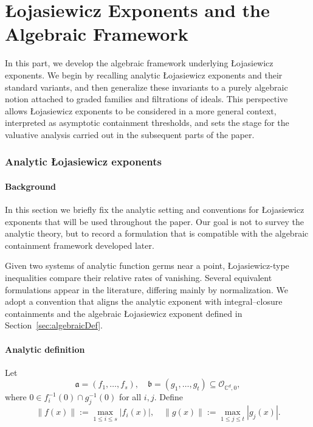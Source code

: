 \documentclass[12pt]{amsart}
\newcommand{\CC}{\mathbb{C}}
\renewcommand{\a}{\mathfrak{a}}
\renewcommand{\b}{\mathfrak{b}}
\newcommand{\cO}{\mathcal{O}}
\theoremstyle{plain}
\theoremstyle{definition}
\numberwithin{equation}{section}
\begin{document}
\part{\L{}ojasiewicz Exponents and the Algebraic Framework} \label{part:algebraicFramework}

In this part, we develop the algebraic framework underlying \L{}ojasiewicz exponents.
We begin by recalling analytic \L{}ojasiewicz exponents and their standard variants, and
then generalize these invariants to a purely algebraic notion attached to graded families and
filtrations of ideals.  This perspective allows \L{}ojasiewicz exponents to be considered in a more general context, interpreted as asymptotic containment thresholds, and sets the stage for the valuative analysis carried out in the subsequent parts of the paper.



\section{Analytic \L{}ojasiewicz exponents} \label{sec:analytic}

\subsection{Background}

In this section we briefly fix the analytic setting and conventions for
\L{}ojasiewicz exponents that will be used throughout the paper.  Our goal is not to
survey the analytic theory, but to record a formulation that is compatible with the
algebraic containment framework developed later.

Given two systems of analytic function germs near a point, \L{}ojasiewicz-type
inequalities compare their relative rates of vanishing.  Several equivalent formulations
appear in the literature, differing mainly by normalization.  We adopt a convention that
aligns the analytic exponent with integral--closure containments and the algebraic
\L{}ojasiewicz exponent defined in Section~\ref{sec:algebraicDef}.


\subsection{Analytic definition}

Let
\[
\a=(f_1,\ldots,f_s),\quad \b=(g_1,\ldots,g_t)\subseteq \cO_{\CC^d,0},
\]
where $0\in f_i^{-1}(0)\cap g_j^{-1}(0)$ for all $i,j$. Define
\[
\|f(x)\|:=\max_{1\le i\le s}|f_i(x)|,\quad
\|g(x)\|:=\max_{1\le j\le t}|g_j(x)|.
\]
\end{document}

